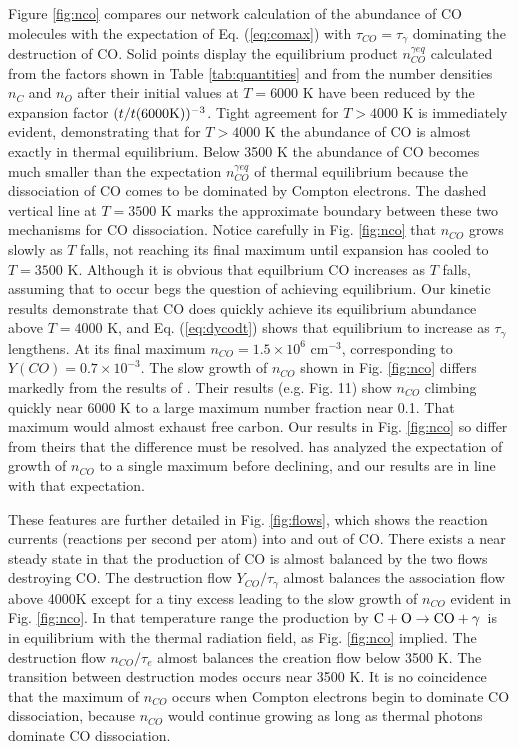 \documentclass[manuscript]{aastex}
\newcommand{\cotoco}{${\rm C} + {\rm O} \to {\rm CO} + \gamma$}
\newcommand{\ncogeq}{n_{CO}^{\gamma eq}}
\begin{document}
Figure \ref{fig:nco}
compares our network calculation of the abundance of CO molecules
with the expectation of Eq. (\ref{eq:comax}) with $\tau_{CO} = \tau_\gamma$
dominating the destruction of CO.
Solid points display the equilibrium product $\ncogeq$ calculated from the
factors shown in Table \ref{tab:quantities}
and from the number densities $n_C$ and $n_O$ after
their initial values at $T=6000$ K have been reduced by the expansion factor
$(t/t(6000 {\rm K}))^{-3}$.
Tight agreement for $T > 4000$ K is immediately evident,
demonstrating that for $T > 4000$ K the abundance of CO is almost exactly in
thermal equilibrium. Below 3500 K the abundance of CO becomes much smaller than
the expectation $\ncogeq$ of thermal equilibrium because the dissociation of CO
comes to be dominated by Compton electrons. The dashed vertical line at
$T=3500$ K marks the approximate boundary between these two mechanisms for CO
dissociation. Notice carefully in Fig. \ref{fig:nco}
that $n_{CO}$ grows slowly as $T$ falls, not reaching
its final maximum until expansion has cooled to $T=3500$ K.
Although it is obvious that equilbrium CO increases as $T$ falls,
assuming that to occur begs the question of achieving equilibrium.
Our kinetic results demonstrate that CO does quickly achieve its
equilibrium abundance above $T = 4000$ K, and Eq. (\ref{eq:dycodt})
shows that equilibrium to increase as $\tau_\gamma$ lengthens.
At its final maximum $n_{CO} = 1.5 \times 10^6$ cm$^{-3}$,
corresponding to $Y(CO) = 0.7 \times 10^{-3}$. The slow growth of $n_{CO}$
shown in Fig. \ref{fig:nco} differs markedly from the results of
\citet{2009ApJ...703..642C}.
Their results (e.g. Fig. 11) show $n_{CO}$ climbing quickly near 6000 K
to a large
maximum number fraction near 0.1. That maximum would almost exhaust free
carbon. Our results in Fig. \ref{fig:nco}
so differ from theirs that the difference
must be resolved. \citet{2013ApJ...762....5C} has analyzed the expectation
of growth of $n_{CO}$ to a single maximum before declining, and our results are
in line with that expectation. 

These features are further detailed in Fig. \ref{fig:flows},
which shows the reaction
currents (reactions per second per atom) into and out of CO. There exists a
near steady state in that the production of CO is almost balanced by the
two flows destroying CO. The destruction flow $Y_{CO}/\tau_\gamma$
almost balances the
association flow above 4000K except for a tiny excess leading to the
slow growth of $n_{CO}$ evident in Fig. \ref{fig:nco}. In that temperature range the
production by \cotoco\ is in equilibrium with the thermal radiation field,
as Fig. \ref{fig:nco} implied. The destruction flow $n_{CO}/\tau_e$
almost balances the
creation flow below 3500 K. The transition between destruction modes occurs
near 3500 K. It is no coincidence that the maximum of $n_{CO}$ occurs when
Compton electrons begin to dominate CO dissociation, because $n_{CO}$ would
continue growing as long as thermal photons dominate CO dissociation. 
\end{document}
